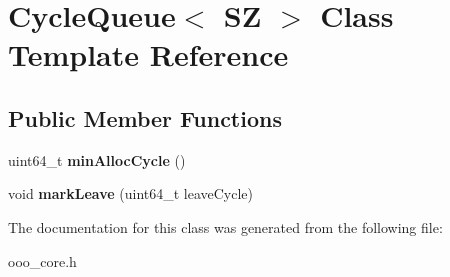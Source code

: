\hypertarget{classCycleQueue}{\section{Cycle\-Queue$<$ S\-Z $>$ Class Template Reference}
\label{classCycleQueue}
}
\subsection*{Public Member Functions}
\begin{DoxyCompactItemize}
\item 
\hypertarget{classCycleQueue_ac55b685ddcebad295752ed52dd1fd0bb}{uint64\-\_\-t {\bfseries min\-Alloc\-Cycle} ()}\label{classCycleQueue_ac55b685ddcebad295752ed52dd1fd0bb}

\item 
\hypertarget{classCycleQueue_a271cdaefc77e3b46761c35bc4cacbf7e}{void {\bfseries mark\-Leave} (uint64\-\_\-t leave\-Cycle)}\label{classCycleQueue_a271cdaefc77e3b46761c35bc4cacbf7e}

\end{DoxyCompactItemize}


The documentation for this class was generated from the following file\-:\begin{DoxyCompactItemize}
\item 
ooo\-\_\-core.\-h\end{DoxyCompactItemize}
